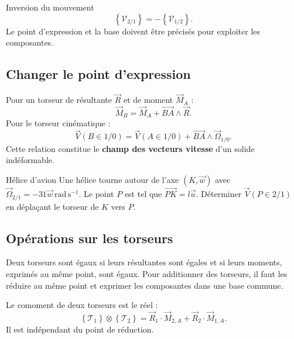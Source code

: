 \begin{TLCineDef}{Inversion du mouvement}
\[
\boxed{\left\{\mathcal V_{2/1}\right\}
=-\left\{\mathcal V_{1/2}\right\}.}
\]
Le point d'expression et la base doivent être précisés pour exploiter
les composantes.
\end{TLCineDef}

\subsection{Changer le point d'expression}

Pour un torseur de résultante $\vec R$ et de moment $\vec M_A$ :
\[
\boxed{\vec M_B=\vec M_A+\overrightarrow{BA}\wedge\vec R.}
\]
Pour le torseur cinématique :
\[
\boxed{\vec V(B\in1/0)=\vec V(A\in1/0)
+\overrightarrow{BA}\wedge\vec\Omega_{1/0}.}
\]
Cette relation constitue le \textbf{champ des vecteurs vitesse} d'un
solide indéformable.

\begin{TLCineApp}{Hélice d'avion}
Une hélice tourne autour de l'axe $(K,\vec w)$ avec
$\vec\Omega_{2/1}=-31\vec w\ \mathrm{rad\,s^{-1}}$. Le point $P$ est
tel que $\overrightarrow{PK}=l\vec u$.
Déterminer $\vec V(P\in2/1)$ en déplaçant le torseur de $K$ vers $P$.
\end{TLCineApp}

\subsection{Opérations sur les torseurs}

Deux torseurs sont égaux si leurs résultantes sont égales et si leurs
moments, exprimés au même point, sont égaux. Pour additionner des
torseurs, il faut les réduire au même point et exprimer les composantes
dans une base commune.

Le comoment de deux torseurs est le réel :
\[
\left\{\mathcal T_1\right\}\otimes
\left\{\mathcal T_2\right\}
=\vec R_1\cdot\vec M_{2,A}
+\vec R_2\cdot\vec M_{1,A}.
\]
Il est indépendant du point de réduction.
